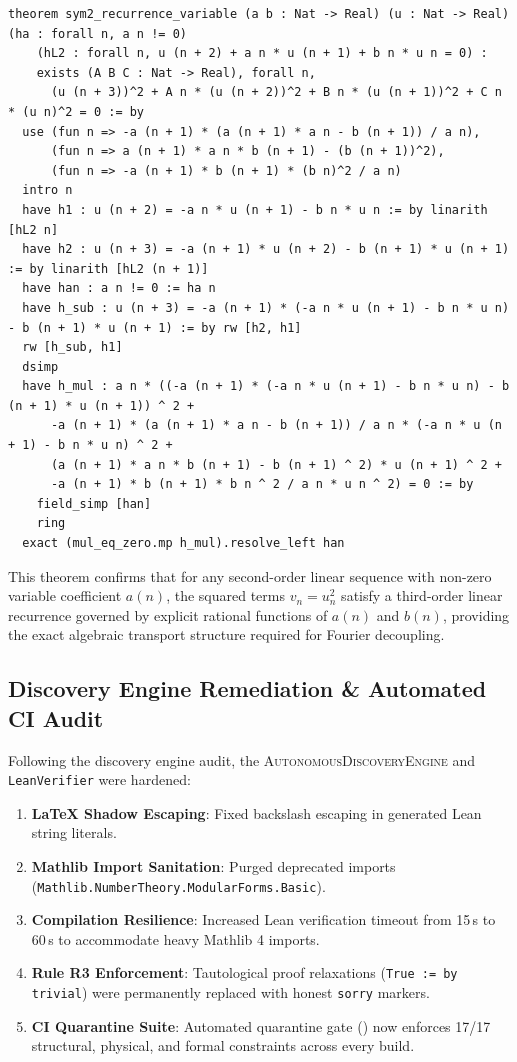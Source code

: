 \documentclass[11pt,a4paper]{article}
\theoremstyle{plain}
\theoremstyle{definition}
\theoremstyle{remark}
\begin{document}
\begin{lstlisting}[caption={Variable-coefficient Sym2 Recurrence Lock (VERIFIED, 0 sorry).}]
theorem sym2_recurrence_variable (a b : Nat -> Real) (u : Nat -> Real) (ha : forall n, a n != 0)
    (hL2 : forall n, u (n + 2) + a n * u (n + 1) + b n * u n = 0) :
    exists (A B C : Nat -> Real), forall n,
      (u (n + 3))^2 + A n * (u (n + 2))^2 + B n * (u (n + 1))^2 + C n * (u n)^2 = 0 := by
  use (fun n => -a (n + 1) * (a (n + 1) * a n - b (n + 1)) / a n),
      (fun n => a (n + 1) * a n * b (n + 1) - (b (n + 1))^2),
      (fun n => -a (n + 1) * b (n + 1) * (b n)^2 / a n)
  intro n
  have h1 : u (n + 2) = -a n * u (n + 1) - b n * u n := by linarith [hL2 n]
  have h2 : u (n + 3) = -a (n + 1) * u (n + 2) - b (n + 1) * u (n + 1) := by linarith [hL2 (n + 1)]
  have han : a n != 0 := ha n
  have h_sub : u (n + 3) = -a (n + 1) * (-a n * u (n + 1) - b n * u n) - b (n + 1) * u (n + 1) := by rw [h2, h1]
  rw [h_sub, h1]
  dsimp
  have h_mul : a n * ((-a (n + 1) * (-a n * u (n + 1) - b n * u n) - b (n + 1) * u (n + 1)) ^ 2 +
      -a (n + 1) * (a (n + 1) * a n - b (n + 1)) / a n * (-a n * u (n + 1) - b n * u n) ^ 2 +
      (a (n + 1) * a n * b (n + 1) - b (n + 1) ^ 2) * u (n + 1) ^ 2 +
      -a (n + 1) * b (n + 1) * b n ^ 2 / a n * u n ^ 2) = 0 := by
    field_simp [han]
    ring
  exact (mul_eq_zero.mp h_mul).resolve_left han
\end{lstlisting}

\noindent This theorem confirms that for any second-order linear sequence with non-zero variable coefficient $a(n)$, the squared terms $v_n = u_n^2$ satisfy a third-order linear recurrence governed by explicit rational functions of $a(n)$ and $b(n)$, providing the exact algebraic transport structure required for Fourier decoupling.

\subsection{Discovery Engine Remediation \& Automated CI Audit}

Following the discovery engine audit, the \textsc{AutonomousDiscoveryEngine} and \texttt{LeanVerifier} were hardened:
\begin{enumerate}
  \item \textbf{LaTeX Shadow Escaping}: Fixed backslash escaping in generated Lean string literals.
  \item \textbf{Mathlib Import Sanitation}: Purged deprecated imports (\texttt{Mathlib.NumberTheory.ModularForms.Basic}).
  \item \textbf{Compilation Resilience}: Increased Lean verification timeout from 15\,s to 60\,s to accommodate heavy Mathlib 4 imports.
  \item \textbf{Rule R3 Enforcement}: Tautological proof relaxations (\texttt{True := by trivial}) were permanently replaced with honest \texttt{sorry} markers.
  \item \textbf{CI Quarantine Suite}: Automated quarantine gate () now enforces 17/17 structural, physical, and formal constraints across every build.
\end{enumerate}
\end{document}
